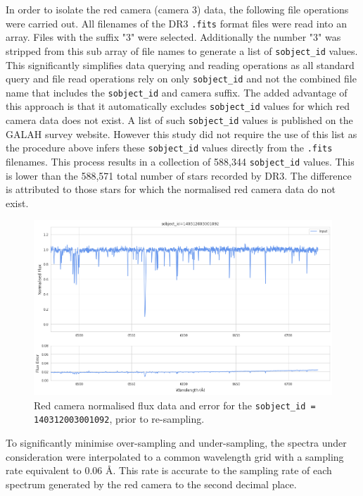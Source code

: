 In order to isolate the red camera (camera 3) data, the following file operations were carried out. All filenames of the DR3 \texttt{.fits} format files were read into an array. Files with the suffix "3" were selected. Additionally the number "3" was stripped from this sub array of file names to generate a list of \texttt{sobject\_id} values. This significantly simplifies data querying and reading operations as all standard query and file read operations rely on only \texttt{sobject\_id} and not the combined file name that includes the \texttt{sobject\_id} and camera suffix. The added advantage of this approach is that it automatically excludes \texttt{sobject\_id} values for which red camera data does not exist. A list of such \texttt{sobject\_id} values is published on the GALAH survey website. However this study did not require the use of this list as the procedure above infers these \texttt{sobject\_id} values directly from the \texttt{.fits} filenames. This process results in a collection of 588,344 \texttt{sobject\_id} values. This is lower than the 588,571 total number of stars recorded by DR3. The difference is attributed to those stars for which the normalised red camera data do not exist. 

\begin{figure}[!htb]
\centering
\includegraphics[scale=.40]{figures/input spectrum.png}
\caption{Red camera normalised flux data and error for the \texttt{sobject\_id = 140312003001092}, prior to re-sampling.}
\end{figure}

To significantly minimise over-sampling and under-sampling, the spectra under consideration were interpolated to a common wavelength grid with a sampling rate equivalent to 0.06 \r{A}. This rate is accurate to the sampling rate of each spectrum generated by the red camera to the second decimal place.

